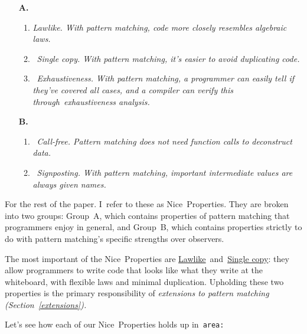 \documentclass[manuscript,screen 12pt, nonacm]{acmart}
\begin{document}
    \begin{enumerate}
      \item [\textbf{A.}]
      \begin{enumerate}[label=\arabic*]
        \item  \it{Lawlike.} With pattern matching, code more closely
        resembles algebraic laws. 
        \label{p1}
        \item~\it{Single copy.} With pattern matching, it's easier to avoid
        duplicating code.
        \label{p2}
        \item~\it{Exhaustiveness.} With pattern matching, a programmer can
        easily tell if they've covered all cases, and a compiler can verify this
        through~\it{exhaustiveness analysis}.
        \label{p5}
    \end{enumerate}

    \item [\textbf{B.}]
    \begin{enumerate}[start=4, label=\arabic*]
      \item~\it{Call-free.} Pattern matching does not need function
      calls to deconstruct data.~\nolinebreak
      \label{p3}
      \item~\it{Signposting.} With pattern matching, important
      intermediate values are always given names. 
      \nolinebreak
      \label{p4}
    \end{enumerate}
  \end{enumerate}

    For the rest of the paper. I~refer to these as Nice~Properties. They are broken
    into two groups: Group~A, which contains properties of pattern matching that
    programmers enjoy in general, and Group~B,  which contains properties strictly
    to do with pattern matching's specific strengths over observers. 

    The most important of the Nice~Properties are
    \hyperref[p1]{Lawlike}~and~\hyperref[p2]{Single copy}: they allow programmers to write code that looks like
    what they write at the whiteboard, with flexible laws and minimal
    duplication. Upholding these two properties is the primary responsibility of
    \it{extensions} to pattern matching (Section~\ref{extensions}). 
    
    Let's see how each of our Nice~Properties holds up in~\tt{area}: 
    
\end{document}
